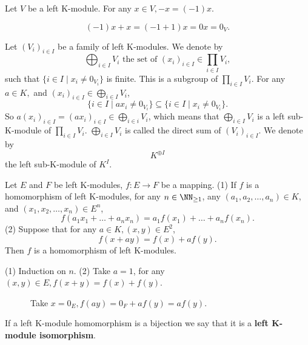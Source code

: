 \begin{propositionenv}
    Let $V$ be a left K-module. For any $x\in V,  -x=(-1)x$.
\end{propositionenv}
\begin{proofenv}
    $$(-1)x+x=(-1+1)x=0x=0_V.$$
\end{proofenv}
\begin{exampleenv}
    Let $(V_i)_{i\in I}$ be a family of left K-modules. We denote by 
    $$\bigoplus_{i\in I}V_i\text{ the set of }(x_i)_{i\in I}\in \prod_{i\in I}V_i, $$
    such that $\{i\in I\mid x_i\not=0_{V_i}\}$ is finite. This is a subgroup of $\prod_{i\in I}V_i$. For any $a\in K, $ and $(x_i)_{i\in I}\in \bigoplus_{i\in I}V_i$, 
    $$\{i\in I\mid ax_i\not=0_{V_i}\}\subseteq\{i\in I\mid x_i\not=0_{V_i}\}.$$
    So $\displaystyle a(x_i)_{i\in I}=(ax_i)_{i\in I}\in \bigoplus_{i\in i}V_i$,  which means that $\displaystyle\bigoplus_{i\in I}V_i$ is a left sub-K-module of $\displaystyle\prod_{i\in I}V_i$. $\displaystyle\bigoplus_{i\in I}V_i$ is called the direct sum of $(V_i)_{i\in I}$. We denote by 
    $$K^{\oplus I}$$
    the left sub-K-module of $K^I$.
\end{exampleenv}
\begin{propositionenv}
    Let $E$ and $F$ be left K-modules, $f:E\rightarrow F$ be a mapping.
    \newline
    (1) If $f$ is a homomorphism of left K-modules,  for any $n\in \NN_{\ge1}$,  any $(a_1, a_2, \dots, a_n)\in K$,  and $(x_1, x_2, \dots, x_n)\in E^n$, 
    $$f(a_1x_1+\dots+a_nx_n)=a_1f(x_1)+\dots+a_nf(x_n).$$
    (2) Suppose that for any $a\in K, (x, y)\in E^2$, 
    $$f(x+ay)=f(x)+af(y).$$
    Then $f$ is a homomorphism of left K-modules.
\end{propositionenv}
\begin{proofenv}
    (1) Induction on $n$.
    \newline
    (2) Take $a=1$,  for any $(x, y)\in E, f(x+y)=f(x)+f(y)$. 
    
    \ \ \ \ \ \ Take $x=0_E, f(ay)=0_F+af(y)=af(y)$.
\end{proofenv}
\begin{definitionenv}
    If a left K-module homomorphism is a bijection we say that it is a \textbf{left K-module isomorphism}.
\end{definitionenv}
